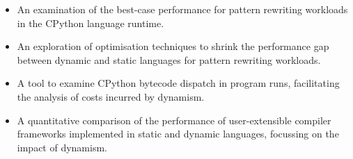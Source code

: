 \begin{itemize}
    \item An examination of the best-case performance for pattern rewriting workloads in the CPython language runtime. %
    \item An exploration of optimisation techniques to shrink the performance gap between dynamic and static languages for pattern rewriting workloads.
    \item A tool to examine CPython bytecode dispatch in program runs, facilitating the analysis of costs incurred by dynamism.
    \item A quantitative comparison of the performance of user-extensible compiler frameworks implemented in static and dynamic languages, focussing on the impact of dynamism.
\end{itemize}